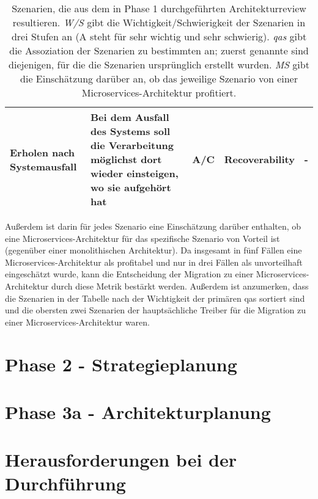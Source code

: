 \begin{table}
\begin{tabular}{ m{} m{6cm} m{0.7cm} m{} p{0.7cm} }
		 Erholen nach Systemausfall & Bei dem Ausfall des Systems soll die Verarbeitung möglichst dort wieder einsteigen, wo sie aufgehört hat & A/C & Recoverability & - \\
		\bottomrule
	\end{tabular}
	\caption[Im Architekturreview ermittelte Qualitätsanforderungen und Szenarien]{
		Szenarien, die aus dem in Phase 1 durchgeführten Architekturreview resultieren.
		\emph{W/S} gibt die Wichtigkeit/Schwierigkeit der Szenarien in drei Stufen an (A steht für sehr wichtig und sehr schwierig).
		\emph{\glspl{qa}} gibt die Assoziation der Szenarien zu bestimmten  an; zuerst genannte sind diejenigen, für die die Szenarien ursprünglich erstellt wurden.
		\emph{MS} gibt die Einschätzung darüber an, ob das jeweilige Szenario von einer Microservices-Architektur profitiert.
		}
	\label{tab:scenarios}
\end{table}

Außerdem ist darin für jedes Szenario eine Einschätzung darüber enthalten, ob eine Microservices-Architektur für das spezifische Szenario von Vorteil ist (gegenüber einer monolithischen Architektur).
Da insgesamt in fünf Fällen eine Microservices-Architektur als profitabel und nur in drei Fällen als unvorteilhaft eingeschätzt wurde, kann die Entscheidung der Migration zu einer Microservices-Architektur durch diese Metrik bestärkt werden.
Außerdem ist anzumerken, dass die Szenarien in der Tabelle nach der Wichtigkeit der primären \glspl{qa} sortiert sind und die obersten zwei Szenarien der hauptsächliche Treiber für die Migration zu einer Microservices-Architektur waren.


\section{Phase 2 - Strategieplanung}
\label{sec:durchführung-phase2}

\section{Phase 3a - Architekturplanung}
\section{Herausforderungen bei der Durchführung}

